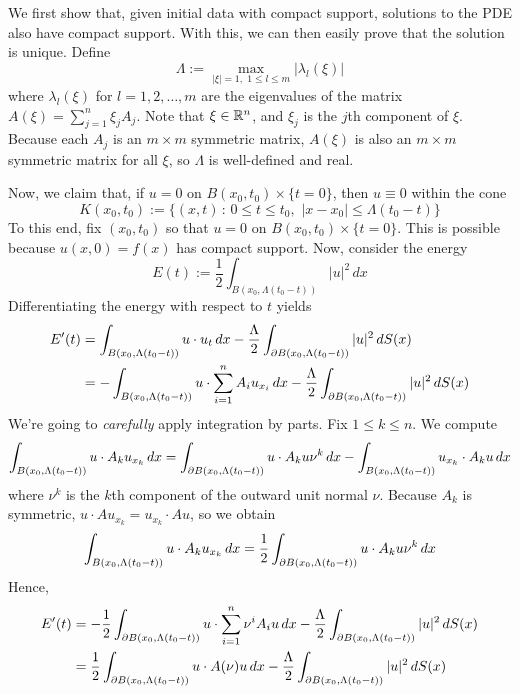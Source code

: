 We first show that, given initial data with compact support, solutions to the PDE also have compact support. With this, we can then easily prove that the solution is unique. Define
$$ \Lambda := \max_{|\xi|=1,\,\, 1 \leq l \leq m} |\lambda_l(\xi)| $$
where $\lambda_l (\xi)$ for $l = 1, 2, \dots, m$ are the eigenvalues of the matrix $A(\xi) = \sum_{j=1}^n \xi_j A_j$. Note that $\xi \in \mathbb{R}^n$, and $\xi_j$ is the $j$th component of $\xi$. Because each $A_j$ is an $m \times m$ symmetric matrix, $A(\xi)$ is also an $m \times m$ symmetric matrix for all $\xi$, so $\Lambda$ is well-defined and real.

\vspace{0.2cm}

Now, we claim that, if $u = 0$ on $B(x_0,t_0) \times \{t = 0\}$, then $u \equiv 0$ within the cone $$ K(x_0,t_0) := \{ (x,t) \, : \, 0 \leq t \leq t_0, \,\, |x-x_0| \leq \Lambda(t_0 - t)\}$$
To this end, fix $(x_0,t_0)$ so that $u=0$ on $B(x_0,t_0) \times \{t=0\}$. This is possible because $u(x,0) = f(x)$ has compact support. Now, consider the energy
$$ E(t) := \frac{1}{2} \int_{B(x_0, \Lambda(t_0-t))} |u|^2 \, dx $$
Differentiating the energy with respect to $t$ yields
\begin{align*}
	E'(t) &= \int_{B(x_0, \Lambda(t_0-t))} u \cdot u_t \, dx - \frac{\Lambda}{2} \int_{\partial B(x_0, \Lambda(t_0-t))} |u|^2 \, dS(x) \\
	&= -\int_{B(x_0, \Lambda(t_0-t))} u \cdot \sum_{i=1}^n A_i u_{x_i} \, dx - \frac{\Lambda}{2} \int_{\partial B(x_0, \Lambda(t_0-t))} |u|^2 \, dS(x)
\end{align*}
We're going to \emph{carefully} apply integration by parts. Fix $1 \leq k \leq n$. We compute
$$ \int_{B(x_0, \Lambda(t_0-t))} u \cdot A_k u_{x_k} \, dx = \int_{\partial B(x_0, \Lambda(t_0-t))} u \cdot A_k u \nu^k \, dx - \int_{B(x_0, \Lambda(t_0-t))} u_{x_k} \cdot A_k u \, dx $$
where $\nu^k$ is the $k$th component of the outward unit normal $\nu$. Because $A_k$ is symmetric, $u \cdot A u_{x_k} = u_{x_k} \cdot A u$, so we obtain
$$ \int_{B(x_0, \Lambda(t_0-t))} u \cdot A_k u_{x_k} \, dx = \frac{1}{2} \int_{\partial B(x_0, \Lambda(t_0-t))} u \cdot A_k u \nu^k \, dx $$
Hence,
\begin{align}
\label{s08energy}
	 E'(t) &= -\frac{1}{2} \int_{\partial B(x_0, \Lambda(t_0-t))} u \cdot \sum_{i=1}^n \nu^i A_i u \, dx - \frac{\Lambda}{2} \int_{\partial B(x_0, \Lambda(t_0-t))} |u|^2 \, dS(x) \\
\label{s08nrgysimp}	  &= \frac{1}{2} \int_{\partial B(x_0, \Lambda(t_0-t))} u \cdot A(\nu) u \, dx - \frac{\Lambda}{2} \int_{\partial B(x_0, \Lambda(t_0-t))} |u|^2 \, dS(x)
\end{align}
